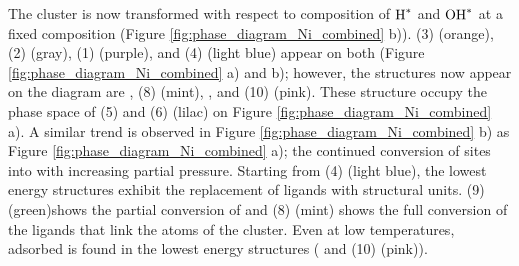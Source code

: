 \documentclass[journal=jctcce,manuscript=article]{achemso}
\begin{document}
The cluster is now transformed with respect to composition of $\ce{H^{*}}$ and $\ce{OH^{*}}$ at a fixed  composition (Figure \ref{fig:phase_diagram_Ni_combined} b)). (3)  (orange), (2)  (gray), (1)  (purple), and (4)  (light blue) appear on both (Figure \ref{fig:phase_diagram_Ni_combined} a) and b); however, the structures now appear on the diagram are , (8)  (mint), , and (10)  (pink). These structure occupy the phase space of (5)  and (6)  (lilac) on Figure \ref{fig:phase_diagram_Ni_combined} a). A similar trend is observed in Figure \ref{fig:phase_diagram_Ni_combined} b) as Figure \ref{fig:phase_diagram_Ni_combined} a); the continued conversion of  sites into  with increasing  partial pressure. Starting from (4)  (light blue), the lowest energy structures exhibit the replacement of  ligands with  structural units. (9)   (green)shows the partial conversion of and (8)  (mint) shows the full conversion of the  ligands that link the  atoms of the cluster. Even at low temperatures, adsorbed  is found in the lowest energy structures ( and (10)  (pink)). 
\end{document}
